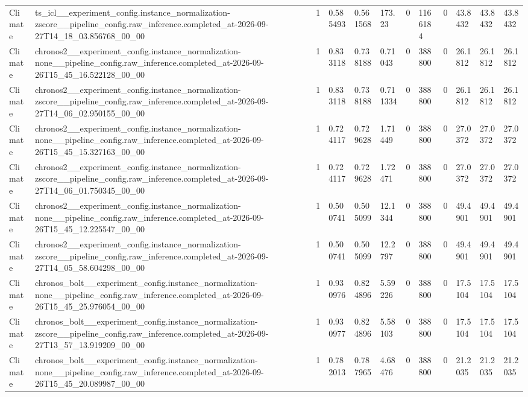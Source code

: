 \begin{tabular}{llllllllllll}
Climate & ts\_icl\_\_experiment\_config.instance\_normalization-zscore\_\_pipeline\_config.raw\_inference.completed\_at-2026-09-27T14\_18\_03.856768\_00\_00 & 1 & 0.585493 & 0.561568 & 173.23 & 0 & 1166184 & 0 & 43.8432 & 43.8432 & 43.8432 \\
Climate & chronos2\_\_experiment\_config.instance\_normalization-none\_\_pipeline\_config.raw\_inference.completed\_at-2026-09-26T15\_45\_16.522128\_00\_00 & 1 & 0.833118 & 0.738188 & 0.71043 & 0 & 388800 & 0 & 26.1812 & 26.1812 & 26.1812 \\
Climate & chronos2\_\_experiment\_config.instance\_normalization-zscore\_\_pipeline\_config.raw\_inference.completed\_at-2026-09-27T14\_06\_02.950155\_00\_00 & 1 & 0.833118 & 0.738188 & 0.711334 & 0 & 388800 & 0 & 26.1812 & 26.1812 & 26.1812 \\
Climate & chronos2\_\_experiment\_config.instance\_normalization-none\_\_pipeline\_config.raw\_inference.completed\_at-2026-09-26T15\_45\_15.327163\_00\_00 & 1 & 0.724117 & 0.729628 & 1.71449 & 0 & 388800 & 0 & 27.0372 & 27.0372 & 27.0372 \\
Climate & chronos2\_\_experiment\_config.instance\_normalization-zscore\_\_pipeline\_config.raw\_inference.completed\_at-2026-09-27T14\_06\_01.750345\_00\_00 & 1 & 0.724117 & 0.729628 & 1.72471 & 0 & 388800 & 0 & 27.0372 & 27.0372 & 27.0372 \\
Climate & chronos2\_\_experiment\_config.instance\_normalization-none\_\_pipeline\_config.raw\_inference.completed\_at-2026-09-26T15\_45\_12.225547\_00\_00 & 1 & 0.500741 & 0.505099 & 12.1344 & 0 & 388800 & 0 & 49.4901 & 49.4901 & 49.4901 \\
Climate & chronos2\_\_experiment\_config.instance\_normalization-zscore\_\_pipeline\_config.raw\_inference.completed\_at-2026-09-27T14\_05\_58.604298\_00\_00 & 1 & 0.500741 & 0.505099 & 12.2797 & 0 & 388800 & 0 & 49.4901 & 49.4901 & 49.4901 \\
Climate & chronos\_bolt\_\_experiment\_config.instance\_normalization-none\_\_pipeline\_config.raw\_inference.completed\_at-2026-09-26T15\_45\_25.976054\_00\_00 & 1 & 0.930976 & 0.824896 & 5.59226 & 0 & 388800 & 0 & 17.5104 & 17.5104 & 17.5104 \\
Climate & chronos\_bolt\_\_experiment\_config.instance\_normalization-zscore\_\_pipeline\_config.raw\_inference.completed\_at-2026-09-27T13\_57\_13.919209\_00\_00 & 1 & 0.930977 & 0.824896 & 5.58103 & 0 & 388800 & 0 & 17.5104 & 17.5104 & 17.5104 \\
Climate & chronos\_bolt\_\_experiment\_config.instance\_normalization-none\_\_pipeline\_config.raw\_inference.completed\_at-2026-09-26T15\_45\_20.089987\_00\_00 & 1 & 0.782013 & 0.787965 & 4.68476 & 0 & 388800 & 0 & 21.2035 & 21.2035 & 21.2035 \\

\end{tabular}
